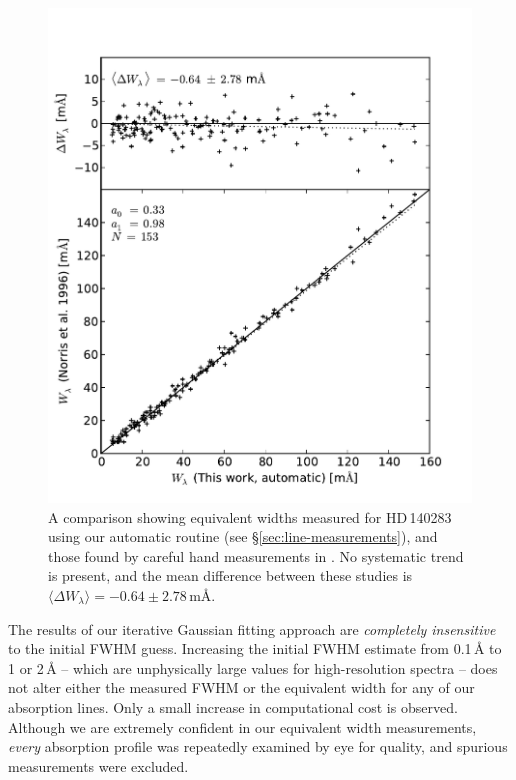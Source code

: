 \documentclass{emulateapj}
\begin{document}
\begin{figure}[t]
	\includegraphics[width=\columnwidth]{./figures/smh-norris.pdf}
	\caption{A comparison showing equivalent widths measured for HD\,140283 using our automatic routine (see \S\ref{sec:line-measurements}), and those found by careful hand measurements in \citet{norris;et-al_1996}. No systematic trend is present, and the mean difference between these studies is ${\langle\Delta{}W_\lambda\rangle = -0.64 \pm 2.78}$\,m\AA{}.}
	\label{fig:ew-compare}
\end{figure}

The results of our iterative Gaussian fitting approach are \textit{completely insensitive} to the initial FWHM guess. Increasing the initial FWHM estimate from 0.1\,\AA{} to 1 or 2\,\AA{} -- which are unphysically large values for high-resolution spectra -- does not alter either the measured FWHM or the equivalent width for any of our absorption lines. Only a small increase in computational cost is observed. Although we are extremely confident in our equivalent width measurements, \textit{every} absorption profile was repeatedly examined by eye for quality, and spurious measurements were excluded.
\end{document}

